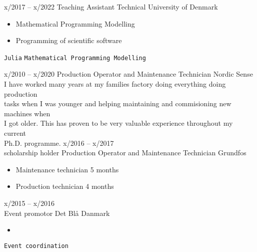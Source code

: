 \documentclass[9pt]{developercv} %
\begin{document}
\vspace{-10 pt}
\begin{entrylist}
	\entry
        {x/2017 -- x/2022}
		{Teaching Assistant}
		{Technical University of Denmark}
		{\vspace{-10pt}
        \begin{itemize}[noitemsep,topsep=0pt,parsep=0pt,partopsep=0pt, leftmargin=-1pt]
            \item Mathematical Programming Modelling 
            \item Programming of scientific software
        \end{itemize} 
        \texttt{Julia} \slashsep \texttt{Mathematical Programming Modelling}}
	\entry
		{x/2010 -- x/2020}
		{Production Operator and Maintenance Technician}
		{Nordic Sense}
		{\vspace{-10pt}\\
		I have worked many years at my families factory doing everything doing production \\
		tasks when I was younger and helping maintaining and commisioning new machines when \\
		I got older. This has proven to be very valuable experience throughout my current \\
		Ph.D. programme.
        }
	\entry
		{x/2016 -- x/2017 \\\footnotesize{scholarship holder}}
		{Production Operator and Maintenance Technician}
		{Grundfos}
		{\vspace{-10pt}
        \begin{itemize}[noitemsep,topsep=0pt,parsep=0pt,partopsep=0pt, leftmargin=-1pt]
            \item Maintenance technician 5 months
            \item Production technician 4 months
        \end{itemize} 
        }
	\entry
		{x/2015 -- x/2016 \\\footnotesize{}}
		{Event promotor}
		{Det Blå Danmark}
		{\vspace{-10pt}
        \begin{itemize}[noitemsep,topsep=0pt,parsep=0pt,partopsep=0pt, leftmargin=-1pt]
            \item 
        \end{itemize} 
        \texttt{Event coordination}}
\end{entrylist}
\end{document}
